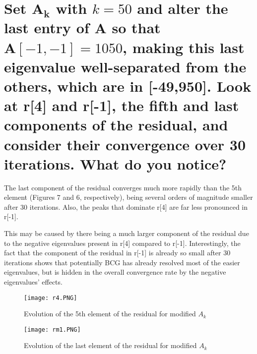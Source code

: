 \documentclass[letterpaper,10pt]{article}
\begin{document}
\clearpage

\section*{ Set $\mathbf{A_k}$ with $k=50$ and alter the last entry of $\mathbf{A}$ so that $\mathbf{A}[-1,-1]=1050$, making this last eigenvalue well-separated from the others, which are in [-49,950]. Look at r[4] and r[-1], the fifth and last components of the residual, and consider their convergence over 30 iterations. What do you notice?}

The last component of the residual converges much more rapidly than the 5th element (Figures 7 and 6, respectively), being several orders of magnitude smaller after 30 iterations. Also, the peaks that dominate r[4] are far less pronounced in r[-1].

This may be caused by there being a much larger component of the residual due to the negative eigenvalues present in r[4] compared to r[-1]. Interestingly, the fact that the component of the residual in r[-1] is already so small after 30 iterations shows that potentially BCG has already resolved most of the easier eigenvalues, but is hidden in the overall convergence rate by the negative eigenvalues' effects.

\begin{figure}[!htb]
\centering
\texttt{[image: r4.PNG]}
\caption{Evolution of the 5th element of the residual for modified $A_k$}
\end{figure}
\begin{figure}[!htb]
\centering
\texttt{[image: rm1.PNG]}
\caption{Evolution of the last element of the residual for modified $A_k$}
\end{figure}
\end{document}
